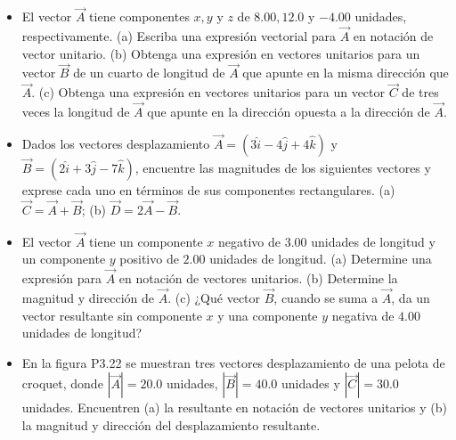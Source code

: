 \documentclass[11pt,a4paper]{article}
\begin{document}
\begin{itemize}
    \item[\textbf{19.}] El vector $\vec{A}$ tiene componentes $x, y$ y $z$ de $8.00, 12.0$ y $-4.00$ unidades, respectivamente. (a) Escriba una expresión vectorial para $\vec{A}$ en notación de vector unitario. (b) Obtenga una expresión en vectores unitarios para un vector $\vec{B}$ de un cuarto de longitud de $\vec{A}$ que apunte en la misma dirección que $\vec{A}$. (c) Obtenga una expresión en vectores unitarios para un vector $\vec{C}$ de tres veces la longitud de $\vec{A}$ que apunte en la dirección opuesta a la dirección de $\vec{A}$.
    \vspace*{6cm}

    \item[\textbf{20.}] Dados los vectores desplazamiento $\vec{A} = (3\hat{i} - 4\hat{j} + 4\hat{k})$ y $\vec{B} = (2\hat{i} + 3\hat{j} - 7\hat{k})$, encuentre las magnitudes de los siguientes vectores y exprese cada uno en términos de sus componentes rectangulares. (a) $\vec{C} = \vec{A} + \vec{B}$; (b) $\vec{D} = 2\vec{A} - \vec{B}$.
    \vspace*{6cm}

    \item[\textbf{21.}] El vector $\vec{A}$ tiene un componente $x$ negativo de $3.00$ unidades de longitud y un componente $y$ positivo de $2.00$ unidades de longitud. (a) Determine una expresión para $\vec{A}$ en notación de vectores unitarios. (b) Determine la magnitud y dirección de $\vec{A}$. (c) ¿Qué vector $\vec{B}$, cuando se suma a $\vec{A}$, da un vector resultante sin componente $x$ y una componente $y$ negativa de $4.00$ unidades de longitud?
    \vspace*{6cm}

    \item[\textbf{22.}] En la figura P3.22 se muestran tres vectores desplazamiento de una pelota de croquet, donde $|\vec{A}| = 20.0$ unidades, $|\vec{B}| = 40.0$ unidades y $|\vec{C}| = 30.0$ unidades. Encuentren (a) la resultante en notación de vectores unitarios y (b) la magnitud y dirección del desplazamiento resultante.
    \vspace*{6cm}
\end{itemize}

\newpage
\end{document}
